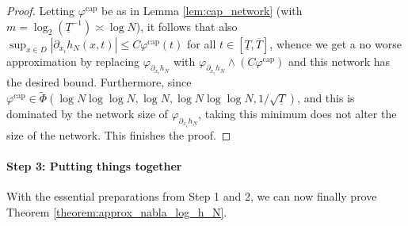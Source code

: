 \documentclass[a4paper, 11pt, headings = small, abstract]{scrartcl}
\begin{document}
\begin{proof}
    Letting $\varphi^{\mathrm{cap}}$ be as in Lemma \ref{lem:cap_network} (with $m=\log_2(\underline{T}^{-1})\asymp\log N$), it follows that also $\sup_{x\in D}|\partial_{x_i}h_N(x, t)|\le C\varphi^{\mathrm{cap}}(t)$ for all $t\in[\underline{T},\overline{T}]$, whence we get a no worse approximation by replacing $\varphi_{\partial_{x_i}h_N}$ with $\varphi_{\partial_{x_i}h_N}\wedge (C\varphi^{\mathrm{cap}})$ and this network has the desired bound.
    Furthermore, since $\varphi^{\mathrm{cap}}\in\widetilde{\Phi}(\log N\log\log N, \log N, \log N\log\log N, 1/\sqrt{\underline{T}})$, and this is dominated by the network size of $\varphi_{\partial_{x_i}h_N}$, taking this minimum does not alter the size of the network.
    This finishes the proof.
\end{proof}

\paragraph{Step 3: Putting things together}
With the essential preparations from Step 1 and 2, we can now finally prove Theorem \ref{theorem:approx_nabla_log_h_N}.
\end{document}
